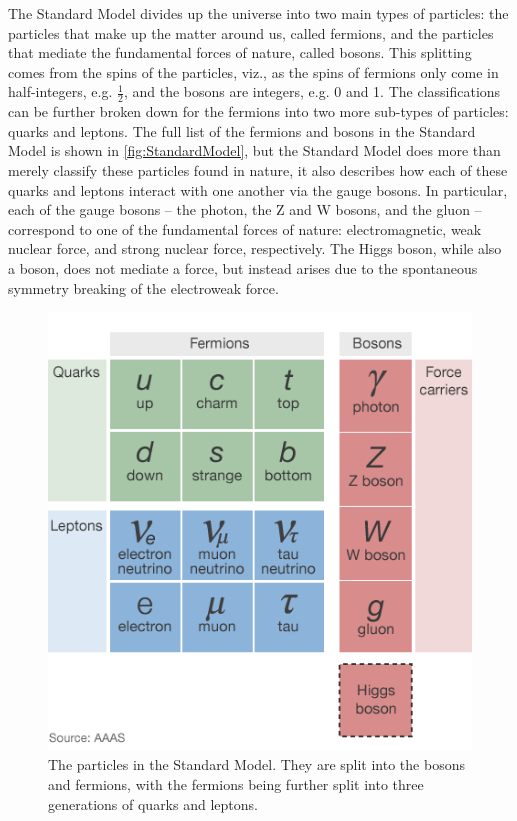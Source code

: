 The Standard Model divides up the universe into two main types of particles: the particles that make up the matter around us, called fermions, and the particles that mediate the fundamental forces of nature, called bosons.
This splitting comes from the spins of the particles, viz., as the spins of fermions only come in half-integers, e.g. $\frac{1}{2}$, and the bosons are integers, e.g. 0 and 1.
The classifications can be further broken down for the fermions into two more sub-types of particles: quarks and leptons.
The full list of the fermions and bosons in the Standard Model is shown in \autoref{fig:StandardModel}, but the Standard Model does more than merely classify these particles found in nature, it also describes how each of these quarks and leptons interact with one another via the gauge bosons.
In particular, each of the gauge bosons -- the photon, the Z and W bosons, and the gluon -- correspond to one of the fundamental forces of nature: electromagnetic, weak nuclear force, and strong nuclear force, respectively.
The Higgs boson, while also a boson, does not mediate a force, but instead arises due to the spontaneous symmetry breaking of the electroweak force. 

\begin{figure}[tbph]
\centering
\includegraphics[width=0.6\linewidth]{Figures/higgs-elementary-particles.png}
\caption[The particles in the Standard Model]{The particles in the Standard Model. They are split into the bosons and fermions, with the fermions being further split into three generations of quarks and leptons.}
\label{fig:StandardModel}
\end{figure}

